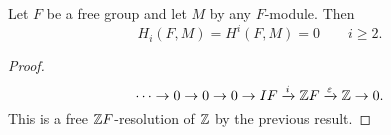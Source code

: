 \begin{corollary}[6.4.9]
    Let $F$ be a free group and let  $M$ by any  $F$-module.
    Then  
    \[
        H_i(F, M) =H^{i}(F, M) =0 \qquad i \ge 2
    .\] 
\end{corollary}
\begin{proof}
    \[
    \cdots \to  0 \to  0\to  0 \to  IF \xrightarrow{i}  \mathbb{Z} F \xrightarrow{\varepsilon}  \mathbb{Z} \to  0
    .\] 
    This is a free $\mathbb{Z} F$-resolution of $\mathbb{Z}$ by the previous result.
\end{proof}
